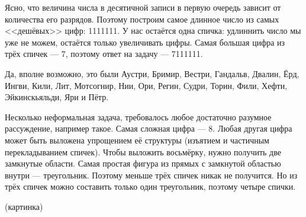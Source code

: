 \begin{itemize}
\itA Ясно, что величина числа в десятичной записи в первую очередь зависит от 
количества его разрядов. Поэтому построим самое длинное число из самых
<<дешёвых>> цифр: 1111111. У нас остаётся одна спичка: удлиннить число мы
уже не можем, остаётся только увеличивать цифры. Самая большая цифра из трёх
спичек --- 7, поэтому ответ на задачу --- 7111111.

\itB Да, вполне возможно, это были 
Аустри, Бримир, Вестри, Гандальв, Двалин, 
Ёрд, Ингви, Кили, Лит, Мотсогнир, 
Нии, Ори, Регин, Судри, Торин,
Фили, Хефти, Эйкинскьяльди, Яри
и Пётр.
                                                        
\itC Несколько неформальная задача, требовалось любое достаточно разумное 
рассуждение, например такое.
Самая сложная цифра --- 8. Любая другая цифра может быть выложена
упрощением её структуры (изъятием и частичным перекладыванием спичек).
Чтобы выложить восьмёрку, нужно получить две замкнутые области.
Самая простая фигура из прямых с замкнутой областью внутри --- треугольник.
Поэтому меньше трёх спичек никак не получится. Но из трёх спичек 
можно составить только один треугольник, поэтому четыре спички.

(картинка)
\end{itemize}
